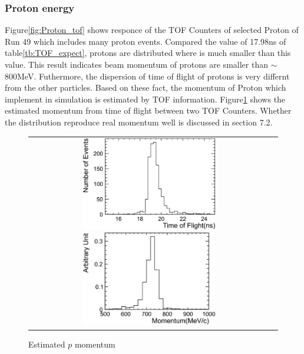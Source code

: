    \subsubsection{Proton energy}\label{proton_energy_section}

Figure\ref{fig:Proton_tof} shows responce of the TOF Counters of selected Proton of Run 49 which includes many proton events.
Compared the value of 17.98ns of table\ref{tb:TOF_expect},
protons are distributed where is much smaller than this value.
This result indicates beam momentum of protons are smaller than $\sim$800MeV.
Futhermore, the dispersion of time of flight of protons is very differnt from the other particles.
Based on these fact, the momentum of Proton which implement in simulation
is estimated by TOF information.
Figure\ref{fig:Proton_momentum} shows the estimated momentum from time of flight between two TOF Counters.
Whether the distribution reproduce real momentum well is discussed in section 7.2.\\

\begin{figure}[htbp]
  \begin{tabular}{cc}
    \begin{minipage}{0.5\hsize}
      \centering
      \includegraphics[width=6cm,clip]{fig/TOF_proton.eps}
      \caption{$p$ TOF response}
      \label{fig:Proton_tof}
    \end{minipage}
    \begin{minipage}{0.5\hsize}
      \centering
      \includegraphics[width=6cm,clip]{fig/Momentum_proton.eps}
      \caption{Estimated $p$ momentum}
      \label{fig:Proton_momentum}
    \end{minipage}
  \end{tabular}
\end{figure} 


